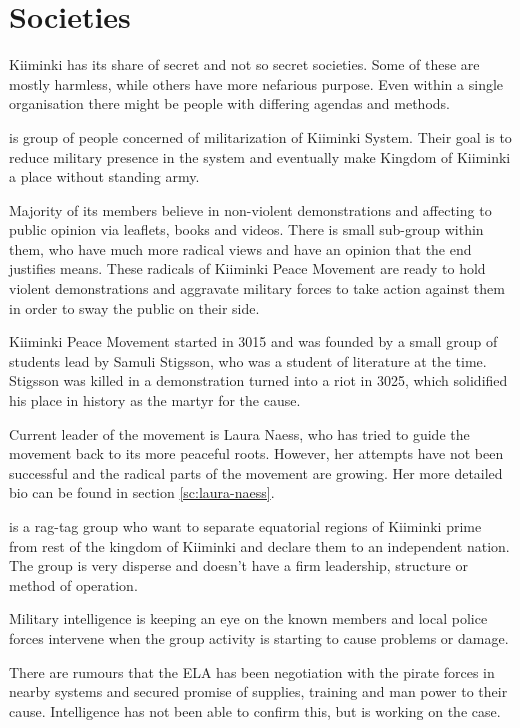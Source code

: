 \documentclass{tufte-book}
\begin{document}
\section{Societies}
\label{sc:societies}

 Kiiminki has its share of secret and not so
secret societies. Some of these are mostly harmless, while others have more
nefarious purpose. Even within a single organisation there might be people
with differing agendas and methods.

 is group of people concerned of
militarization of Kiiminki System. Their goal is to reduce military presence
in the system and eventually make Kingdom of Kiiminki a place without standing
army.

Majority of its members believe in non-violent demonstrations and affecting to
public opinion via leaflets, books and videos. There is small sub-group within
them, who have much more radical views and have an opinion that the end
justifies means. These radicals of Kiiminki Peace Movement are ready to hold
violent demonstrations and aggravate military forces to take action against
them in order to sway the public on their side.

Kiiminki Peace Movement started in 3015 and was founded by a small group of
students lead by Samuli Stigsson, who was a student of literature at the time.
Stigsson was killed in a demonstration turned into a riot in 3025, which
solidified his place in history as the martyr for the cause.

Current leader of the movement is Laura Naess, who has tried to guide the
movement back to its more peaceful roots. However, her attempts have not been
successful and the radical parts of the movement are growing. Her more
detailed bio can be found in section \ref{sc:laura-naess}.

 is a rag-tag group who want to
separate equatorial regions of Kiiminki prime from rest of the kingdom of
Kiiminki and declare them to an independent nation. The group is very
disperse and doesn't have a firm leadership, structure or method of operation.

Military intelligence is keeping an eye on the known members and local police
forces intervene when the group activity is starting to cause problems or
damage.

There are rumours that the ELA has been negotiation with the pirate forces in
nearby systems and secured promise of supplies, training and man power to
their cause. Intelligence has not been able to confirm this, but is working
on the case.
\end{document}
